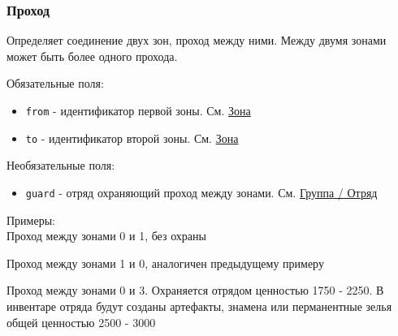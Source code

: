 \subsubsection{Проход}
\label{connection}
Определяет соединение двух зон, проход между ними.
Между двумя зонами может быть более одного прохода.

Обязательные поля:
\begin{itemize}
\item \texttt{from} - идентификатор первой зоны. См. \hyperref[zone]{Зона}
\item \texttt{to} - идентификатор второй зоны. См. \hyperref[zone]{Зона}
\end{itemize}

Необязательные поля:
\begin{itemize}
\item \texttt{guard} - отряд охраняющий проход между зонами. См. \hyperref[group]{Группа / Отряд}
\end{itemize}

Примеры:\\
Проход между зонами 0 и 1, без охраны
\begin{figure}[h]

\end{figure}

Проход между зонами 1 и 0, аналогичен предыдущему примеру
\begin{figure}[h]

\end{figure}

Проход между зонами 0 и 3.
Охраняется отрядом ценностью 1750 - 2250.
В инвентаре отряда будут созданы артефакты, знамена или перманентные зелья общей ценностью 2500 - 3000
\begin{figure}[h]

\end{figure}